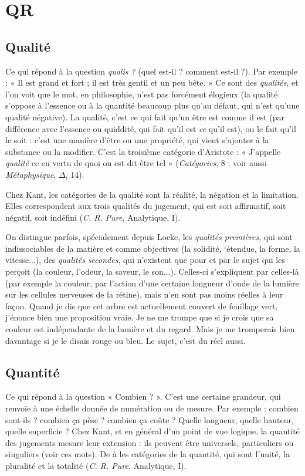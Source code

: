 \chapter{QR}
\section{Qualité}
Ce qui répond à la question {\it qualis ?} (quel est-il ? comment est-il ?).
Par exemple : « Il est grand et fort ; il est très gentil et un peu
bête. » Ce sont des {\it qualités}, et l’on voit que le mot, en philosophie, n’est
pas forcément élogieux (la qualité s’oppose à l’essence ou à la quantité
beaucoup plus qu’au défaut, qui n’est qu’une qualité négative). La qualité,
c’est ce qui fait qu’un être est comme il est (par différence avec l’essence ou
quiddité, qui fait qu’il est {\it ce} qu’il est), ou le fait qu’il le soit : c’est une
manière d’être ou une propriété, qui vient s'ajouter à la substance ou la
modifier. C’est la troisième catégorie d’Aristote : « J’appelle {\it qualité} ce en
vertu de quoi on est dit être tel » ({\it Catégories}, 8 ; voir aussi {\it Métaphysique}, $\Delta$,
14).

Chez Kant, les catégories de la qualité sont la réalité, la négation et la
limitation. Elles correspondent aux trois qualités du jugement, qui est soit
affirmatif, soit négatif, soit indéfini ({\it C. R. Pure}, Analytique, I).

On distingue parfois, spécialement depuis Locke, les {\it qualités premières},
qui sont indissociables de la matière et comme objectives (la solidité,
‘étendue, la forme, la vitesse...), des {\it qualités secondes}, qui n'existent que
pour et par le sujet qui les perçoit (la couleur, l'odeur, la saveur, le son...).
Celles-ci s’expliquent par celles-là (par exemple la couleur, par l’action
d’une certaine longueur d’onde de la lumière sur les cellules nerveuses de la
rétine), mais n’en sont pas moins réelles à leur façon. Quand je dis que cet
arbre est actuellement couvert de feuillage vert, j’énonce bien une proposition
vraie. Je ne me trompe que si je crois que sa couleur est indépendante
de la lumière et du regard. Mais je me tromperais bien davantage si je le
disais rouge ou bleu. Le sujet, c’est du réel aussi.

\section{Quantité}
Ce qui répond à la question « Combien ? ». C’est une certaine
grandeur, qui renvoie à une échelle donnée de numération ou
de mesure. Par exemple : combien sont-ils ? combien ça pèse ? combien ça
coûte ? Quelle longueur, quelle hauteur, quelle superficie ? Chez Kant, et en
général d’un point de vue logique, la quantité des jugements mesure leur
extension : ils peuvent être universels, particuliers ou singuliers (voir ces mots).
De à les catégories de la quantité, qui sont l'unité, la pluralité et la totalité
({\it C. R. Pure}, Analytique, I).

